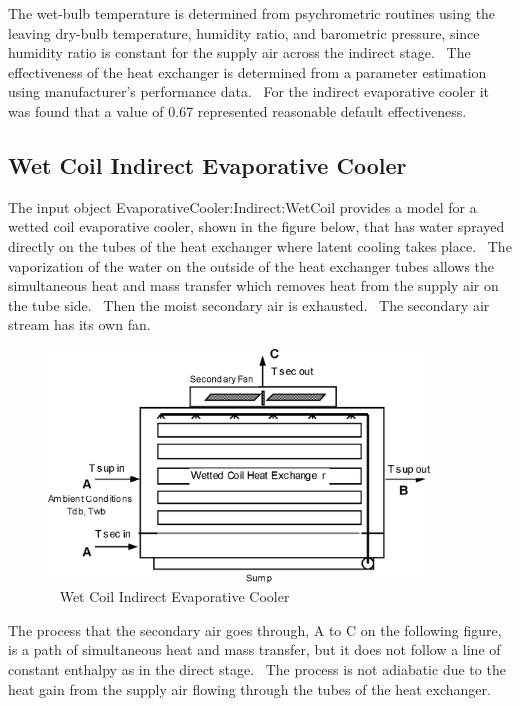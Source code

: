 The wet-bulb temperature is determined from psychrometric routines using the leaving dry-bulb temperature, humidity ratio, and barometric pressure, since humidity ratio is constant for the supply air across the indirect stage.~ The effectiveness of the heat exchanger is determined from a parameter estimation using manufacturer's performance data.~ For the indirect evaporative cooler it was found that a value of 0.67 represented reasonable default effectiveness.

\subsection{Wet Coil Indirect Evaporative Cooler}\label{wet-coil-indirect-evaporative-cooler}

The input object EvaporativeCooler:Indirect:WetCoil provides a model for a wetted coil evaporative cooler, shown in the figure below, that has water sprayed directly on the tubes of the heat exchanger where latent cooling takes place.~ The vaporization of the water on the outside of the heat exchanger tubes allows the simultaneous heat and mass transfer which removes heat from the supply air on the tube side.~ Then the moist secondary air is exhausted.~ The secondary air stream has its own fan.

\begin{figure}[hbtp] %
\centering
\includegraphics[width=0.9\textwidth, height=0.9\textheight, keepaspectratio=true]{media/image4797.png}
\caption{  Wet Coil Indirect Evaporative Cooler \protect \label{fig:wet-coil-indirect-evaporative-cooler}}
\end{figure}

The process that the secondary air goes through, A to C on the following figure, is a path of simultaneous heat and mass transfer, but it does not follow a line of constant enthalpy as in the direct stage.~ The process is not adiabatic due to the heat gain from the supply air flowing through the tubes of the heat exchanger.

